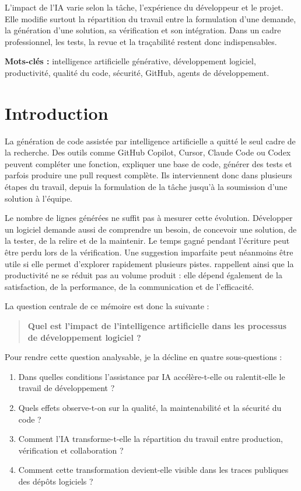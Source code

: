 \documentclass[12pt,a4paper,oneside]{report}
\begin{document}
L'impact de l'IA varie selon la tâche, l'expérience du développeur et le projet. Elle modifie surtout la répartition du travail entre la formulation d'une demande, la génération d'une solution, sa vérification et son intégration. Dans un cadre professionnel, les tests, la revue et la traçabilité restent donc indispensables.

\noindent\textbf{Mots-clés :} intelligence artificielle générative, développement logiciel, productivité, qualité du code, sécurité, GitHub, agents de développement.

\tableofcontents
\clearpage
{}

\chapter{Introduction}

La génération de code assistée par intelligence artificielle a quitté le seul cadre de la recherche. Des outils comme GitHub Copilot, Cursor, Claude Code ou Codex peuvent compléter une fonction, expliquer une base de code, générer des tests et parfois produire une pull request complète. Ils interviennent donc dans plusieurs étapes du travail, depuis la formulation de la tâche jusqu'à la soumission d'une solution à l'équipe.

Le nombre de lignes générées ne suffit pas à mesurer cette évolution. Développer un logiciel demande aussi de comprendre un besoin, de concevoir une solution, de la tester, de la relire et de la maintenir. Le temps gagné pendant l'écriture peut être perdu lors de la vérification. Une suggestion imparfaite peut néanmoins être utile si elle permet d'explorer rapidement plusieurs pistes. \textcite{forsgren2021space} rappellent ainsi que la productivité ne se réduit pas au volume produit : elle dépend également de la satisfaction, de la performance, de la communication et de l'efficacité.

La question centrale de ce mémoire est donc la suivante :

\begin{quote}
\centering\bfseries
Quel est l'impact de l'intelligence artificielle dans les processus de développement logiciel ?
\end{quote}

Pour rendre cette question analysable, je la décline en quatre sous-questions :
\begin{enumerate}
  \item Dans quelles conditions l'assistance par IA accélère-t-elle ou ralentit-elle le travail de développement ?
  \item Quels effets observe-t-on sur la qualité, la maintenabilité et la sécurité du code ?
  \item Comment l'IA transforme-t-elle la répartition du travail entre production, vérification et collaboration ?
  \item Comment cette transformation devient-elle visible dans les traces publiques des dépôts logiciels ?
\end{enumerate}
\end{document}
